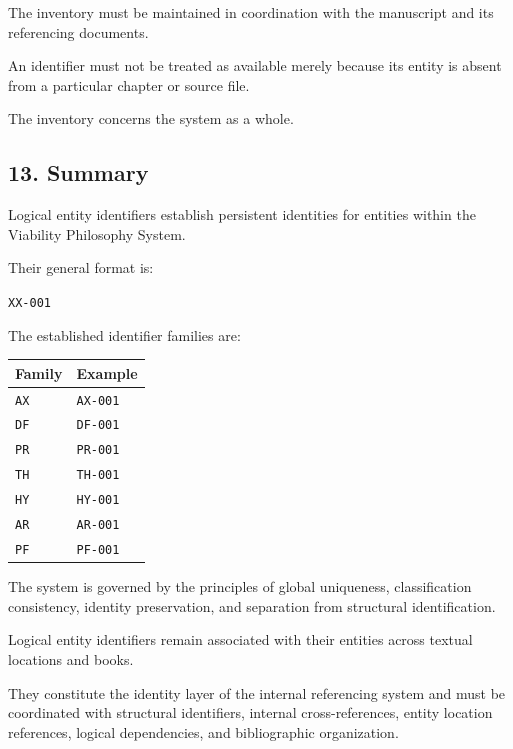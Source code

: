The inventory must be maintained
in coordination with the manuscript
and its referencing documents.

An identifier must not be treated
as available merely because its
entity is absent from a particular
chapter or source file.

The inventory concerns the system
as a whole.


\subsection*{13. Summary}

Logical entity identifiers establish
persistent identities for entities
within the Viability Philosophy
System.

Their general format is:

\begin{center}
    \texttt{XX-001}
\end{center}

The established identifier families
are:

\begin{center}
\begin{tabular}{ll}
    \toprule
    \textbf{Family} & \textbf{Example} \\
    \midrule
    \texttt{AX} & \texttt{AX-001} \\
    \texttt{DF} & \texttt{DF-001} \\
    \texttt{PR} & \texttt{PR-001} \\
    \texttt{TH} & \texttt{TH-001} \\
    \texttt{HY} & \texttt{HY-001} \\
    \texttt{AR} & \texttt{AR-001} \\
    \texttt{PF} & \texttt{PF-001} \\
    \bottomrule
\end{tabular}
\end{center}

The system is governed by the
principles of global uniqueness,
classification consistency,
identity preservation, and
separation from structural
identification.

Logical entity identifiers
remain associated with their
entities across textual locations
and books.

They constitute the identity
layer of the internal referencing
system and must be coordinated
with structural identifiers,
internal cross-references,
entity location references,
logical dependencies, and
bibliographic organization.

\cleardoublepage

